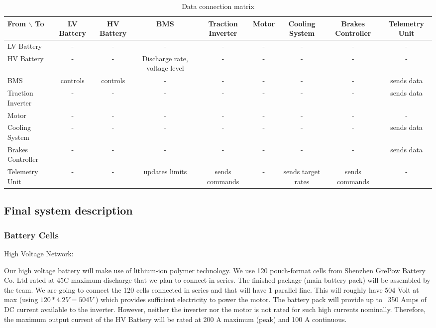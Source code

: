 \begin{table}
    \centering
    \begin{adjustbox}{width=\textwidth,center}
    \begin{tabular}{|l|c|c|c|c|c|c|c|c|}
    \hline
    From $\backslash$ To & LV Battery & HV Battery & BMS & Traction Inverter & Motor & Cooling System & Brakes Controller & Telemetry Unit  \\
    \hline
    LV Battery & - & - & - & - & - & - & - & - \\
    HV Battery  & - & - & Discharge rate, voltage level & - & - & - & - & - \\
    BMS & controls & controls & - & - & - & - & - & sends data \\
    Traction Inverter & - & - & - & - & - & - & - & sends data \\
    Motor & - & - & - & - & - & - & - & - \\
    Cooling System & - & - & - & - & - & - & - & sends data \\
    Brakes Controller & - & - & - & - & - & - & - & sends data \\
    Telemetry Unit & - & - & updates limits & sends commands & - & sends target rates & sends commands & - \\
    \hline
    \end{tabular}
    \end{adjustbox}
    \caption{Data connection matrix}
    \label{data-connectivity-matrix-battery}
\end{table}


\subsection{Final system description}
\subsubsection{Battery Cells}

High Voltage Network:

Our high voltage battery will make use of lithium-ion polymer technology. We use 120 pouch-format cells from Shenzhen GrePow Battery Co. Ltd rated at 45C maximum discharge that we plan to connect in series. 
The finished package (main battery pack) will be assembled by the team.
We are going to connect the 120 cells connected in series and that will have 1 parallel line. This will roughly have 504 Volt at max (using \(120 * 4.2V = 504 V \) ) 
which provides sufficient electricity to power the motor.
The battery pack will provide up to ~350 Amps of DC current available to the inverter. However, neither the inverter nor the motor is not rated for such high currents nominally. 
\newline
Therefore, the maximum output current of the HV Battery will be rated at 200 A maximum (peak) and 100 A continuous. 

